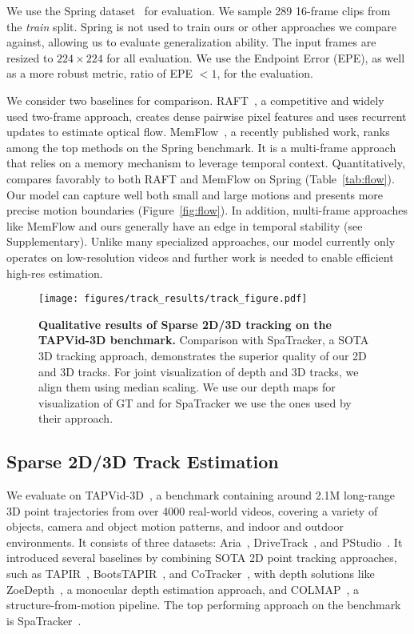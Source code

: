 We use the Spring dataset~\cite{mehl2023spring} for evaluation.
We sample 289 16-frame clips from the \emph{train} split.
Spring is not used to train ours or other approaches we compare against, allowing us to evaluate generalization ability.
The input frames are resized to $224\times224$ for all evaluation.
We use the Endpoint Error (EPE), as well as a more robust metric, ratio of EPE $<1$, for the evaluation. 

We consider two baselines for comparison. 
RAFT~\cite{teed2020raft}, a competitive and widely used two-frame approach, creates dense pairwise pixel features and uses recurrent updates to estimate optical flow. 
MemFlow~\cite{dong2024memflow}, a recently published work, ranks among the top methods on the Spring benchmark.
It is a multi-frame approach that relies on a memory mechanism to leverage temporal context. 
Quantitatively, \methodName compares favorably to both RAFT and MemFlow on Spring (Table~\ref{tab:flow}).
Our model can capture well both small and large motions and presents more precise motion boundaries (Figure~\ref{fig:flow}). 
In addition, multi-frame approaches like MemFlow and ours generally have an edge in temporal stability (see Supplementary). 
Unlike many specialized approaches, our model currently only operates on low-resolution videos and further work is needed to enable efficient high-res estimation.





\begin{figure*}
    \centering
    \texttt{[image: figures/track\_results/track\_figure.pdf]}
    \caption{\textbf{Qualitative results of Sparse 2D/3D tracking on the TAPVid-3D benchmark.}
    Comparison with SpaTracker, a SOTA 3D tracking approach, demonstrates the superior quality of our 2D and 3D tracks.
    For joint visualization of depth and 3D tracks, we align them using median scaling.
    We use our depth maps for visualization of GT and for SpaTracker we use the ones used by their approach. 
    }\label{fig:track}
\end{figure*}

\subsection{Sparse 2D/3D Track Estimation}
We evaluate on TAPVid-3D~\cite{koppula2024tapvid3d}, a benchmark containing around 2.1M long-range 3D point trajectories from over 4000 real-world videos, covering a variety of objects, camera and object motion patterns, and indoor and outdoor environments.
It consists of three datasets: Aria~\cite{pan2023aria}, DriveTrack~\cite{sun2020waymodataset}, and PStudio~\cite{joo2015pstudio}.
It introduced several baselines by combining SOTA 2D point tracking approaches, such as TAPIR~\cite{doersch2023tapir}, BootsTAPIR~\cite{doersch2024bootstap}, and CoTracker~\cite{karaev2023cotracker}, with depth solutions like ZoeDepth~\cite{bhat2023zoedepth}, a monocular depth estimation approach, and COLMAP~\cite{schoenberger2016sfm,schoenberger2016mvs}, a structure-from-motion pipeline.
The top performing approach on the benchmark is SpaTracker~\cite{spatracker}.

